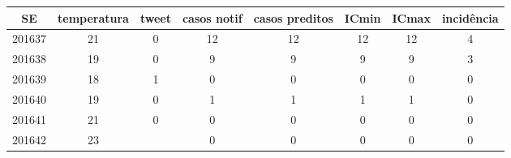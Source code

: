 \begin{tabular}{c|ccccccc}
  \hline
SE & temperatura & tweet & casos notif & casos preditos & ICmin & ICmax & incidência \\ 
  \hline
201637 & 21 & 0 & 12 & 12 & 12 & 12 & 4 \\ 
  201638 & 19 & 0 & 9 & 9 & 9 & 9 & 3 \\ 
  201639 & 18 & 1 & 0 & 0 & 0 & 0 & 0 \\ 
  201640 & 19 & 0 & 1 & 1 & 1 & 1 & 0 \\ 
  201641 & 21 & 0 & 0 & 0 & 0 & 0 & 0 \\ 
  201642 & 23 &  & 0 & 0 & 0 & 0 & 0 \\ 
   \hline
\end{tabular}
